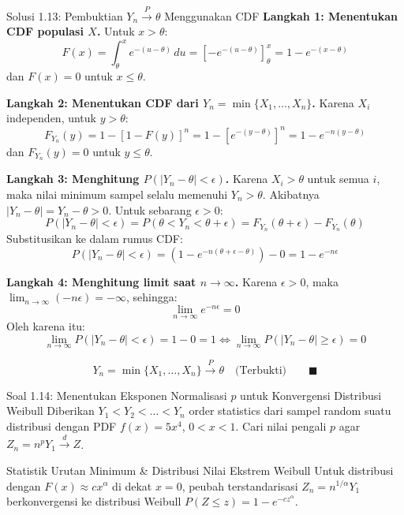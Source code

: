 \documentclass[10pt,twoside]{article}
\begin{document}
\begin{solbox}{Solusi 1.13: Pembuktian $Y_n \xrightarrow{P} \theta$ Menggunakan CDF}
\textbf{Langkah 1: Menentukan CDF populasi $X$.}
Untuk $x > \theta$:
\[
F(x) = \int_\theta^x e^{-(u-\theta)} \, du = \left[-e^{-(u-\theta)}\right]_\theta^x = 1 - e^{-(x-\theta)}
\]
dan $F(x) = 0$ untuk $x \le \theta$.

\textbf{Langkah 2: Menentukan CDF dari $Y_n = \min\{X_1, \dots, X_n\}$.}
Karena $X_i$ independen, untuk $y > \theta$:
\[
F_{Y_n}(y) = 1 - [1 - F(y)]^n = 1 - \left[e^{-(y-\theta)}\right]^n = 1 - e^{-n(y-\theta)}
\]
dan $F_{Y_n}(y) = 0$ untuk $y \le \theta$.

\textbf{Langkah 3: Menghitung $P(|Y_n - \theta| < \epsilon)$.}
Karena $X_i > \theta$ untuk semua $i$, maka nilai minimum sampel selalu memenuhi $Y_n > \theta$. Akibatnya $|Y_n - \theta| = Y_n - \theta > 0$.
Untuk sebarang $\epsilon > 0$:
\[
P(|Y_n - \theta| < \epsilon) = P(\theta < Y_n < \theta + \epsilon) = F_{Y_n}(\theta + \epsilon) - F_{Y_n}(\theta)
\]
Substitusikan ke dalam rumus CDF:
\[
P(|Y_n - \theta| < \epsilon) = \left(1 - e^{-n(\theta + \epsilon - \theta)}\right) - 0 = 1 - e^{-n\epsilon}
\]

\textbf{Langkah 4: Menghitung limit saat $n \to \infty$.}
Karena $\epsilon > 0$, maka $\lim_{n \to \infty} (-n\epsilon) = -\infty$, sehingga:
\[
\lim_{n \to \infty} e^{-n\epsilon} = 0
\]
Oleh karena itu:
\[
\lim_{n \to \infty} P(|Y_n - \theta| < \epsilon) = 1 - 0 = 1 \iff \lim_{n \to \infty} P(|Y_n - \theta| \ge \epsilon) = 0
\]

\[
\boxed{Y_n = \min\{X_1, \dots, X_n\} \xrightarrow{P} \theta \quad \text{(Terbukti)}} \qquad \blacksquare
\]
\end{solbox}

\begin{soalbox}{Soal 1.14: Menentukan Eksponen Normalisasi $p$ untuk Konvergensi Distribusi Weibull}
Diberikan $Y_1 < Y_2 < \dots < Y_n$ order statistics dari sampel random suatu distribusi dengan PDF $f(x) = 5x^4$, $0 < x < 1$. Cari nilai pengali $p$ agar $Z_n = n^p Y_1 \xrightarrow{d} Z$.
\end{soalbox}

\begin{tipbox}{Statistik Urutan Minimum \& Distribusi Nilai Ekstrem Weibull}
Untuk distribusi dengan $F(x) \approx c x^\alpha$ di dekat $x = 0$, peubah terstandarisasi $Z_n = n^{1/\alpha} Y_1$ berkonvergensi ke distribusi Weibull $P(Z \le z) = 1 - e^{-c z^\alpha}$.
\end{tipbox}
\end{document}
